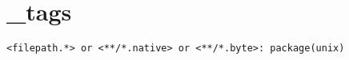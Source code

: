 \section{\_tags}
\begin{verbatim}
<filepath.*> or <**/*.native> or <**/*.byte>: package(unix)
\end{verbatim}	